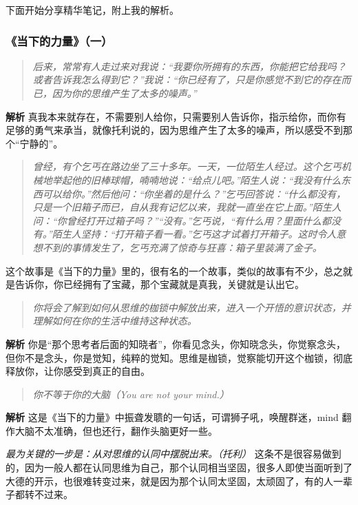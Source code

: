 下面开始分享精华笔记，附上我的解析。

\subsubsection{《当下的力量》（一）}

\begin{quote}\it
    后来，常常有人走过来对我说：“我要你所拥有的东西，你能把它给我吗？或者告诉我怎么得到它？”我说：“你已经有了，只是你感觉不到它的存在而已，因为你的思维产生了太多的噪声。”
\end{quote}

\textbf{解析} 真我本来就存在，不需要别人给你，只需要别人告诉你，指示给你，而你有足够的勇气来承当，就像托利说的，因为思维产生了太多的噪声，所以感受不到那个“宁静的”。

\begin{quote}\it
    曾经，有个乞丐在路边坐了三十多年。一天，一位陌生人经过。这个乞丐机械地举起他的旧棒球帽，喃喃地说：“给点儿吧。”陌生人说：“我没有什么东西可以给你。”然后他问：“你坐着的是什么？”乞丐回答说：“什么都没有，只是一个旧箱子而已，自从我有记忆以来，我就一直坐在它上面。”陌生人问：“你曾经打开过箱子吗？”“没有。”乞丐说，“有什么用？里面什么都没有。”陌生人坚持：“打开箱子看一看。”乞丐这才试着打开箱子。这时令人意想不到的事情发生了，乞丐充满了惊奇与狂喜：箱子里装满了金子。
\end{quote}

这个故事是《当下的力量》里的，很有名的一个故事，类似的故事有不少，总之就是告诉你，你已经拥有了宝藏，那个宝藏就是真我，关键就是认出它。

\begin{quote}\it
    你将会了解到如何从思维的枷锁中解放出来，进入一个开悟的意识状态，并理解如何在你的生活中维持这种状态。
\end{quote}

\textbf{解析} 你是“那个思考者后面的知晓者”，你看见念头，你知晓念头，你觉察念头，但你不是念头，你是觉知，纯粹的觉知。思维是枷锁，觉察能切开这个枷锁，彻底释放你，让你感受到真正的自由。

\begin{quote}\it
    你不等于你的大脑（You are not your mind.）
\end{quote}

\textbf{解析} 这是《当下的力量》中振聋发聩的一句话，可谓狮子吼，唤醒群迷，mind 翻作大脑不太准确，但也还行，翻作头脑更好一些。

\textit{最为关键的一步是：从对思维的认同中摆脱出来。（托利）} 这条不是很容易做到的，因为一般人都在认同思维为自己，那个认同相当坚固，很多人即使当面听到了大德的开示，也很难转变过来，就是因为那个认同太坚固，太顽固了，有的人一辈子都转不过来。

